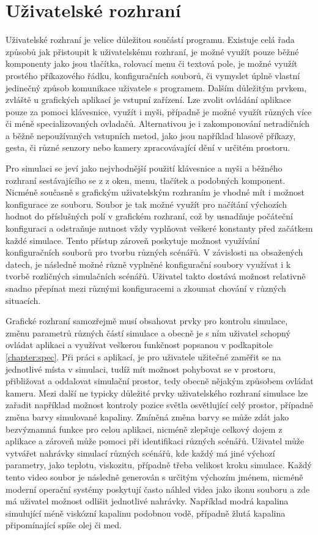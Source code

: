 \section{Uživatelské rozhraní}
Uživatelské rozhraní je velice důležitou součástí programu. Existuje celá řada způsobů jak přistoupit k uživatelskému rozhraní, je možné využít pouze běžné komponenty jako jsou tlačítka, rolovací menu či textová pole, je možné využít prostého příkazového řádku, konfiguračních souborů, či vymyslet úplně vlastní jedinečný způsob komunikace uživatele s programem. Dalším důležitým prvkem, zvláště u grafických aplikací je vstupní zařízení. Lze zvolit ovládání aplikace pouze za pomoci klávesnice, využít i myši, případně je možné využít různých více či méně specializovaných ovladačů. Alternativou je i zakomponování netradičních a běžně nepoužívaných vstupních metod, jako jsou například hlasové příkazy, gesta, či různé senzory nebo kamery zpracovávající dění v určitém prostoru.

Pro simulaci se jeví jako nejvhodnější použití klávesnice a myši a běžného rozhraní sestávajícího se z z oken, menu, tlačítek a podobných komponent. Nicméně současně s grafickým uživatelským rozhraním je vhodné mít i možnost konfigurace ze souboru. Soubor je tak možné využít pro načítání výchozích hodnot do příslušných polí v grafickém rozhraní, což by usnadňuje počáteční konfiguraci a odstraňuje nutnost vždy vyplňovat veškeré konstanty před začátkem každé simulace. Tento přístup zároveň poskytuje možnost využívání konfiguračních souborů pro tvorbu různých scénářů. V závislosti na obsažených datech, je následně možné různě vyplněné konfigurační soubory využívat i k tvorbě rozličných simulačních scénářů. Uživatel takto dostává možnost relativně snadno přepínat mezi různými konfiguracemi a zkoumat chování v různých situacích.

Grafické rozhraní samozřejmě musí obsahovat prvky pro kontrolu simulace, změnu parametrů různých částí simulace a obecně je s ním uživatel schopný ovládat aplikaci a využívat veškerou funkčnost popsanou v podkapitole \ref{chapter:spec}. Při práci s aplikací, je pro uživatele užitečné zaměřit se na jednotlivé místa v simulaci, tudíž mít možnost pohybovat se v prostoru, přibližovat a oddalovat simulační prostor, tedy obecně nějakým způsobem ovládat kameru. Mezi další ne typicky důležité prvky uživatelského rozhraní simulace lze zařadit například možnost kontroly pozice světla osvětlující celý prostor, případně změna barvy simulované kapaliny. Zmíněná změna barvy se může zdát jako bezvýznamná funkce pro celou aplikaci, nicméně zlepšuje celkový dojem z aplikace a zároveň může pomoci při identifikaci různých scénářů. Uživatel může vytvářet nahrávky simulací různých scénářů, kde každý má jiné výchozí parametry, jako teplotu, viskozitu, případně třeba velikost kroku simulace. Každý tento video soubor je následně generován s určitým výchozím jménem, nicméně moderní operační systémy poskytují často náhled videa jako ikonu souboru a zde má uživatel možnost odlišit jednotlivé nahrávky. Například modrá kapalina simulující méně viskózní kapalinu podobnou vodě, případně žlutá kapalina připomínající spíše olej či med.

